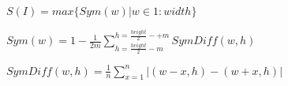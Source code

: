 \documentclass{article}
\begin{document}
$ S(I) = max\{Sym(w) | w \in 1:width\} $
\pagebreak

$ Sym(w) = 1 - \frac{1}{2m} \sum_{h=\frac{height}{2}-m}^{h=\frac{height}{2}-+m} SymDiff(w,h) $
\pagebreak

$ SymDiff(w,h) = \frac{1}{n} \sum_{x=1}^n |(w-x,h) - (w+x,h)| $
\pagebreak
\end{document}
